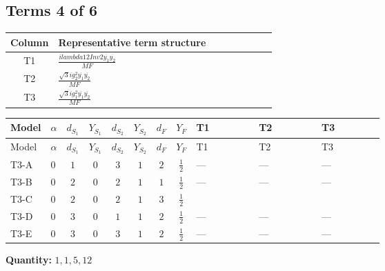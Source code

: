 \documentclass[8pt]{article}
\begin{document}
\begin{landscape}
\subsection*{Terms 4 of 6}
\begin{center}
\begin{tabular}{@{}c >{\raggedright\arraybackslash}p{0.82\linewidth}@{}}
\toprule
Column & Representative term structure \\
\midrule
T1 & \(\displaystyle \frac{i lambda12Inv2 \overline{y_{1}} \overline{y_{2}}}{MF}\) \\
\midrule
T2 & \(\displaystyle \frac{\sqrt{3} i g_{2}^{2} \overline{y_{1}} \overline{y_{2}}}{MF}\) \\
\midrule
T3 & \(\displaystyle \frac{\sqrt{3} i g_{1}^{2} \overline{y_{1}} \overline{y_{2}}}{MF}\) \\
\midrule
\bottomrule
\end{tabular}
\end{center}
\smallskip
\tiny
\begin{longtable}{@{}llcccccc >{\raggedright\arraybackslash}p{0.21\linewidth} >{\raggedright\arraybackslash}p{0.21\linewidth} >{\raggedright\arraybackslash}p{0.21\linewidth}@{}}
\toprule
Model & $\alpha$ & $d_{S_1}$ & $Y_{S_1}$ & $d_{S_2}$ & $Y_{S_2}$ & $d_F$ & $Y_F$ & T1 & T2 & T3 \\
\midrule
\endfirsthead
\toprule
Model & $\alpha$ & $d_{S_1}$ & $Y_{S_1}$ & $d_{S_2}$ & $Y_{S_2}$ & $d_F$ & $Y_F$ & T1 & T2 & T3 \\
\midrule
\endhead
T3-A & $0$ & $1$ & $0$ & $3$ & $1$ & $2$ & $\frac{1}{2}$ & --- & --- & --- \\
\midrule
T3-B & $0$ & $2$ & $0$ & $2$ & $1$ & $1$ & $\frac{1}{2}$ & --- & --- & --- \\
\midrule
T3-C & $0$ & $2$ & $0$ & $2$ & $1$ & $3$ & $\frac{1}{2}$ & \scriptsize\adjustbox{max width=\linewidth}{$\begin{gathered} \frac{i lambda12Inv2 \overline{y_{1}} \overline{y_{2}}}{3 MF}\end{gathered}$} & \scriptsize\adjustbox{max width=\linewidth}{$\begin{gathered} \frac{\sqrt{3} i g_{2}^{2} \overline{y_{1}} \overline{y_{2}}}{4 MF}\end{gathered}$} & \scriptsize\adjustbox{max width=\linewidth}{$\begin{gathered} \frac{\sqrt{3} i g_{1}^{2} \overline{y_{1}} \overline{y_{2}}}{8 MF}\end{gathered}$} \\
\midrule
T3-D & $0$ & $3$ & $0$ & $1$ & $1$ & $2$ & $\frac{1}{2}$ & --- & --- & --- \\
\midrule
T3-E & $0$ & $3$ & $0$ & $3$ & $1$ & $2$ & $\frac{1}{2}$ & --- & --- & --- \\
\midrule
\bottomrule
\end{longtable}
\clearpage
\noindent\textbf{Quantity: }$\mathrm{1,1,5,12}$\par\smallskip

\end{landscape}
\end{document}
